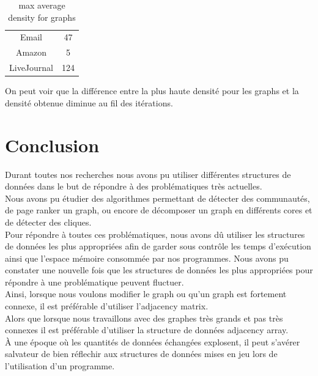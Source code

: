 \documentclass[a4paper,10pt]{report}
\begin{document}
\begin{table}[H]
\caption{max average density for graphs}
\centering
\begin{tabular}{|c c |}
\hline
Email & 47 \\
Amazon & 5 \\
LiveJournal & 124  \\
\hline
\end{tabular}
\label {table:nonlin}
\end{table}
On peut voir que la différence entre la plus haute densité pour les graphs et la densité obtenue diminue au fil des itérations. 
\chapter{Conclusion}
Durant toutes nos recherches nous avons pu utiliser différentes structures de données dans le but de répondre à des problématiques très actuelles. 
\\
Nous avons pu étudier des algorithmes permettant de détecter des communautés, de page ranker un graph, ou encore de décomposer un graph en différents cores et de détecter des cliques.
\\
\newline
Pour répondre à toutes ces problématiques, nous avons dû utiliser les structures de données les plus appropriées afin de garder sous contrôle les temps d'exécution ainsi que l'espace mémoire consommée par nos programmes.
\newline
Nous avons pu constater une nouvelle fois que les structures de données les plus appropriées pour répondre à une problématique peuvent fluctuer.
\\
Ainsi, lorsque nous voulons modifier le graph ou qu'un graph est fortement connexe, il est préférable d'utiliser l'adjacency matrix.\\
Alors que lorsque nous travaillons avec des graphes très grands et pas très connexes il est préférable d'utiliser la structure de données adjacency array.
\newline
\\
À une époque où les quantités de données échangées explosent, il peut s'avérer salvateur de bien réflechir aux structures de données mises en jeu lors de l'utilisation d'un programme.
\end{document}
